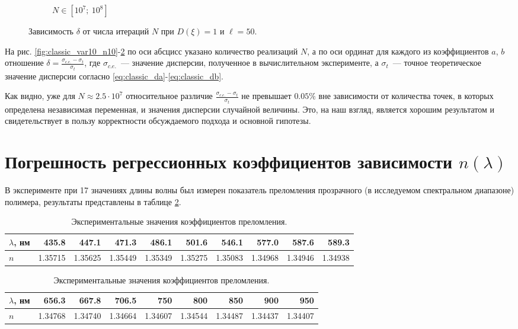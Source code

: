 \documentclass[11pt,a4paper]{article}
\theoremstyle{definition}
\begin{document}
\begin{figure}[h!]
\begin{subfigure}[b]{0.3\textwidth}
    \caption{$N \in [10^7;~10^8]$}
    \label{fig:classic_var1_n50_end}
  \end{subfigure}
  \caption{Зависимость $\delta$ от числа итераций $N$ при $D(\xi) = 1$ и $\ell = 50$.}
  \label{fig:classic_var1_n50}
\end{figure}

На рис. \ref{fig:classic_var10_n10}-\ref{fig:classic_var1_n50}
по оси абсцисс указано количество реализаций $N$, а по
оси ординат для каждого из коэффициентов $a$, $b$ отношение
$\delta = \frac{\sigma_{c.e.} - \sigma_t}{\sigma_t}$, где $\sigma_{c.e.}$~---
значение дисперсии, полученное в вычислительном эксперименте, а
$\sigma_{t}$~--- точное теоретическое значение дисперсии согласно 
\eqref{eq:classic_da}-\eqref{eq:classic_db}.

Как видно, уже для $N \approx 2.5 \cdot 10^7$ относительное различие
$\frac{\sigma_{c.e.} - \sigma_t}{\sigma_t}$ не
превышает $0.05 \%$ вне зависимости от количества точек, в которых
определена независимая переменная, и значения дисперсии случайной величины.
Это, на наш взгляд, является хорошим результатом и
свидетельствует в пользу корректности обсуждаемого подхода и основной
гипотезы.

\section{Погрешность регрессионных коэффициентов зависимости $n(\lambda)$}

В эксперименте при 17 значениях длины волны был измерен
показатель преломления прозрачного (в исследуемом спектральном
диапазоне) полимера, результаты представлены в таблице \ref{tabl:source_data}.

\begin{table}[h]
  \footnotesize
  \begin{tabular}{| l | r | r | r | r | r | r | r | r | r |} \hline
	$\lambda$, нм	& 435.8		& 447.1		& 471.3		& 486.1		& 501.6		& 546.1		& 577.0		& 587.6		& 589.3		\\ \hline
	$n$				& 1.35715	& 1.35625	& 1.35449	& 1.35349	& 1.35275	& 1.35083	& 1.34968	& 1.34946	& 1.34938	\\ \hline
  \end{tabular}
  \begin{tabular}{| l | r | r | r | r | r | r | r | r |} \hline
	$\lambda$, нм	& 656.3		& 667.8		& 706.5		& 750		& 800		& 850		& 900		& 950			\\ \hline
	$n$				& 1.34768	& 1.34740	& 1.34664	& 1.34607	& 1.34544	& 1.34487	& 1.34437	& 1.34407		\\ \hline
  \end{tabular}
  \caption{Экспериментальные значения коэффициентов преломления.}
  \label{tabl:source_data}
\end{table}
\end{document}
